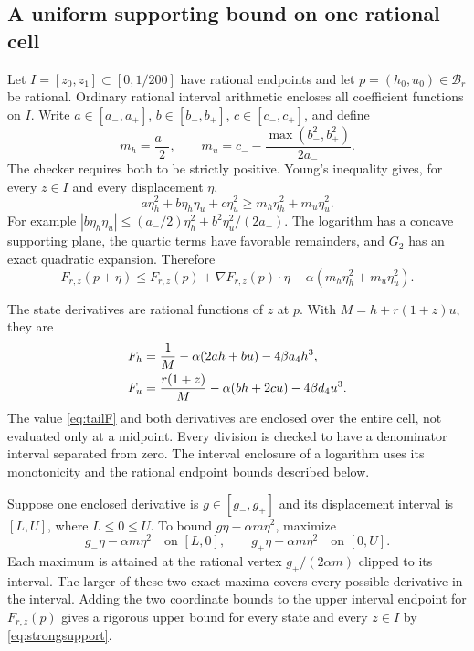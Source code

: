 \documentclass[11pt]{article}
\theoremstyle{remark}
\begin{document}
\subsection{A uniform supporting bound on one rational cell}

Let $I=[z_0,z_1]\subset[0,1/200]$ have rational endpoints and let $p=(h_0,u_0)\in\mathcal B_r$ be rational. Ordinary rational interval arithmetic encloses all coefficient functions on $I$. Write $a\in[a_-,a_+]$, $b\in[b_-,b_+]$, $c\in[c_-,c_+]$, and define
\begin{equation}\label{eq:curvature}
 m_h=\frac{a_-}{2},\qquad
 m_u=c_- -\frac{\max(b_-^2,b_+^2)}{2a_-}.
\end{equation}
The checker requires both to be strictly positive. Young's inequality gives, for every $z\in I$ and every displacement $\eta$,
\begin{equation}\label{eq:young}
 a\eta_h^2+b\eta_h\eta_u+c\eta_u^2
 \ge m_h\eta_h^2+m_u\eta_u^2.
\end{equation}
For example $|b\eta_h\eta_u|\le(a_-/2)\eta_h^2+
 b^2\eta_u^2/(2a_-)$. The logarithm has a concave supporting plane, the quartic terms have favorable remainders, and $G_2$ has an exact quadratic expansion. Therefore
\begin{equation}\label{eq:strongsupport}
 F_{r,z}(p+\eta)\le F_{r,z}(p)+\nabla F_{r,z}(p)\cdot\eta
 -\alpha(m_h\eta_h^2+m_u\eta_u^2).
\end{equation}

The state derivatives are rational functions of $z$ at $p$. With $M=h+r(1+z)u$, they are
\begin{align}\label{eq:tailgrad}
 F_h&=\frac1M-\alpha(2ah+bu)-4\beta a_4h^3,\notag\\
 F_u&=\frac{r(1+z)}M-\alpha(bh+2cu)-4\beta d_4u^3.
\end{align}
The value \eqref{eq:tailF} and both derivatives are enclosed over the entire cell, not evaluated only at a midpoint. Every division is checked to have a denominator interval separated from zero. The interval enclosure of a logarithm uses its monotonicity and the rational endpoint bounds described below.

Suppose one enclosed derivative is $g\in[g_-,g_+]$ and its displacement interval is $[L,U]$, where $L\le0\le U$. To bound
$g\eta-\alpha m\eta^2$, maximize
\[
 g_-\eta-\alpha m\eta^2\quad\text{on }[L,0],\qquad
 g_+\eta-\alpha m\eta^2\quad\text{on }[0,U].
\]
Each maximum is attained at the rational vertex $g_\pm/(2\alpha m)$ clipped to its interval. The larger of these two exact maxima covers every possible derivative in the interval. Adding the two coordinate bounds to the upper interval endpoint for $F_{r,z}(p)$ gives a rigorous upper bound for every state and every $z\in I$ by \eqref{eq:strongsupport}.
\end{document}

